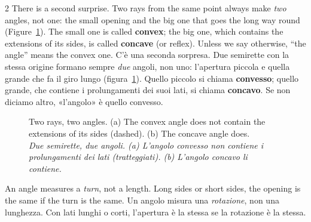 \documentclass[10pt,a4paper,oneside]{book}
\newif\ifIT
\newenvironment{bi}%
  {\begin{paracol}{2}\global\ITfalse\selectlanguage{english}}%
  {\end{paracol}}
\newcommand{\IT}{\switchcolumn\global\ITtrue\selectlanguage{italian}}
\newcommand{\bicap}[2]{\caption{#1\\{\color{itgreen}\itshape #2}}}
\begin{document}
\begin{bi}
There is a second surprise. Two rays from the same point always make \emph{two} angles, not one: the small opening and the big one that goes the long way round (Figure~\ref{fig:convex}). The small one is called \textbf{convex}; the big one, which contains the extensions of its sides, is called \textbf{concave} (or reflex). Unless we say otherwise, ``the angle'' means the convex one.
\IT
C'è una seconda sorpresa. Due semirette con la stessa origine formano sempre \emph{due} angoli, non uno: l'apertura piccola e quella grande che fa il giro lungo (figura~\ref{fig:convex}). Quello piccolo si chiama \textbf{convesso}; quello grande, che contiene i prolungamenti dei suoi lati, si chiama \textbf{concavo}. Se non diciamo altro, «l'angolo» è quello convesso.
\end{bi}

\begin{figure}[htbp]
\centering
\bicap{Two rays, two angles. (a) The convex angle does not contain the extensions of its sides (dashed). (b) The concave angle does.}%
      {Due semirette, due angoli. (a) L'angolo convesso non contiene i prolungamenti dei lati (tratteggiati). (b) L'angolo concavo li contiene.}
\label{fig:convex}
\end{figure}

\begin{keyidea}{}{}
An angle measures a \emph{turn}, not a length. Long sides or short sides, the opening is the same if the turn is the same.
\tcblower
Un angolo misura una \emph{rotazione}, non una lunghezza. Con lati lunghi o corti, l'apertura è la stessa se la rotazione è la stessa.
\end{keyidea}
\end{document}
